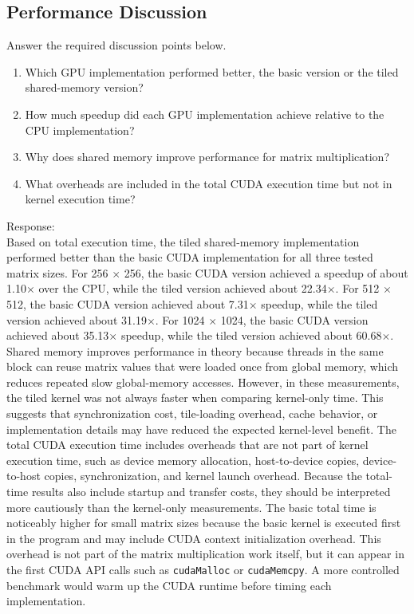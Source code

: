 \documentclass[11pt]{article}
\begin{document}
\subsection{Performance Discussion}
Answer the required discussion points below.

\begin{enumerate}
\item Which GPU implementation performed better, the basic version or the tiled shared-memory version?
\item How much speedup did each GPU implementation achieve relative to the CPU implementation?
\item Why does shared memory improve performance for matrix multiplication?
\item What overheads are included in the total CUDA execution time but not in kernel execution time?
\end{enumerate}

\noindent Response:\\
Based on total execution time, the tiled shared-memory implementation performed better than the basic CUDA implementation for all three tested matrix sizes. For 256 $\times$ 256, the basic CUDA version achieved a speedup of about 1.10$\times$ over the CPU, while the tiled version achieved about 22.34$\times$. For 512 $\times$ 512, the basic CUDA version achieved about 7.31$\times$ speedup, while the tiled version achieved about 31.19$\times$. For 1024 $\times$ 1024, the basic CUDA version achieved about 35.13$\times$ speedup, while the tiled version achieved about 60.68$\times$. Shared memory improves performance in theory because threads in the same block can reuse matrix values that were loaded once from global memory, which reduces repeated slow global-memory accesses. However, in these measurements, the tiled kernel was not always faster when comparing kernel-only time. This suggests that synchronization cost, tile-loading overhead, cache behavior, or implementation details may have reduced the expected kernel-level benefit. The total CUDA execution time includes overheads that are not part of kernel execution time, such as device memory allocation, host-to-device copies, device-to-host copies, synchronization, and kernel launch overhead. Because the total-time results also include startup and transfer costs, they should be interpreted more cautiously than the kernel-only measurements. The basic total time is noticeably higher for small matrix sizes because the basic kernel is executed first in the program and may include CUDA context initialization overhead. This overhead is not part of the matrix multiplication work itself, but it can appear in the first CUDA API calls such as \texttt{cudaMalloc} or \texttt{cudaMemcpy}. A more controlled benchmark would warm up the CUDA runtime before timing each implementation.
\end{document}
